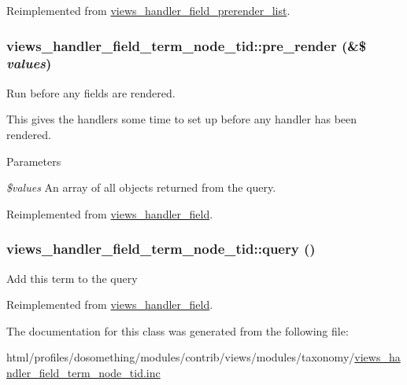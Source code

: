 Reimplemented from \hyperlink{classviews__handler__field__prerender__list_a6a88df29dbdd11aefc5d108dca6530e0}{views\_\-handler\_\-field\_\-prerender\_\-list}.\hypertarget{classviews__handler__field__term__node__tid_a7e144b3fe39c483eea722484b87ff950}{
\subsubsection[{pre\_\-render}]{\setlength{\rightskip}{0pt plus 5cm}views\_\-handler\_\-field\_\-term\_\-node\_\-tid::pre\_\-render (\&\$ {\em values})}}
\label{classviews__handler__field__term__node__tid_a7e144b3fe39c483eea722484b87ff950}
Run before any fields are rendered.

This gives the handlers some time to set up before any handler has been rendered.


\begin{DoxyParams}{Parameters}
\item[{\em \$values}]An array of all objects returned from the query. \end{DoxyParams}


Reimplemented from \hyperlink{classviews__handler__field_aff134f525e1f83271183939fda4cd0e8}{views\_\-handler\_\-field}.\hypertarget{classviews__handler__field__term__node__tid_a8160a16d41604b141768dc313b6223b9}{
\subsubsection[{query}]{\setlength{\rightskip}{0pt plus 5cm}views\_\-handler\_\-field\_\-term\_\-node\_\-tid::query ()}}
\label{classviews__handler__field__term__node__tid_a8160a16d41604b141768dc313b6223b9}
Add this term to the query 

Reimplemented from \hyperlink{classviews__handler__field_a4f661f91bcbe80d4a00c30a31456c502}{views\_\-handler\_\-field}.

The documentation for this class was generated from the following file:\begin{DoxyCompactItemize}
\item 
html/profiles/dosomething/modules/contrib/views/modules/taxonomy/\hyperlink{views__handler__field__term__node__tid_8inc}{views\_\-handler\_\-field\_\-term\_\-node\_\-tid.inc}\end{DoxyCompactItemize}
